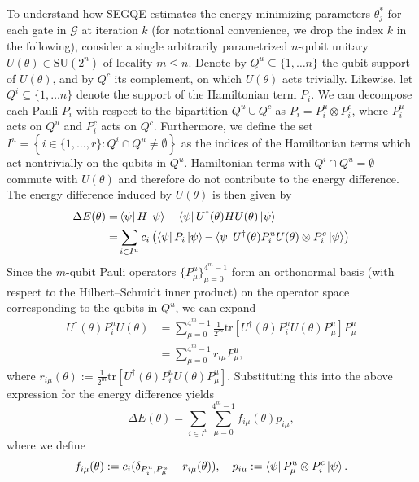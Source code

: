 To understand how SEGQE estimates the energy-minimizing parameters $\theta^*_j$ for each gate in $\mathcal{G}$ at iteration $k$ (for notational convenience, we drop the index $k$ in the following), consider a single arbitrarily parametrized $n$-qubit unitary $U(\theta) \in \mathrm{SU}(2^n)$ of locality $m\leq n$. 
Denote by $Q^u\subseteq\{1,\ldots n\}$ the qubit support of $U(\theta)$, and by $Q^c$ its complement, on which $U(\theta)$ acts trivially. Likewise, let $Q^i\subseteq\{1,\ldots n\}$ denote the support of the Hamiltonian term $P_i$. We can decompose each Pauli $P_i$ with respect to the bipartition $Q^u\cup Q^c$ as $P_i=P^u_i\otimes P^c_i$, where $P^u_i$ acts on $Q^u$ and $P^c_i$ acts on $Q^c$. Furthermore, we define the set $I^u=\left\{i\in\{1,\ldots,r\}: Q^i\cap Q^u\neq \emptyset\right\}$ as the indices of the Hamiltonian terms which act nontrivially on the qubits in $Q^u$. Hamiltonian terms with $Q^i \cap Q^u = \emptyset$ commute with $U(\theta)$ and therefore do not contribute to the energy difference. The energy difference induced by $U(\theta)$ is then given by
\begin{align}
    \Delta E(\theta)=&\bra{\psi}H\ket{\psi}-\bra{\psi}U^\dagger(\theta) H U(\theta) \ket{\psi}\\
	=& \sum_{i\in I^u}c_i 
	\left(\bra{\psi}P_i\ket{\psi}{-}\bra{\psi}U^\dagger(\theta) P^u_i U(\theta)\otimes P_i^c\ket{\psi} \right) \nonumber
\end{align}
    Since the $m$-qubit Pauli operators $\{P_\mu^u\}_{\mu=0}^{4^m-1}$ form an orthonormal basis (with respect to the Hilbert--Schmidt inner product) on the operator space corresponding to the qubits in $Q^u$, we can expand
    \begin{align}
        U^\dagger(\theta) P^u_i U(\theta) &= \sum_{\mu=0}^{4^m-1}\frac{1}{2^m}\mathrm{tr}\left[U^\dagger(\theta) P^u_iU(\theta)P_\mu^u\right]P_\mu^u\\&=\sum_{\mu=0}^{4^m-1}r_{i\mu}P_\mu^u,
    \end{align}
    where $r_{i\mu}(\theta):=\frac{1}{2^m}\mathrm{tr}\left[U^\dagger(\theta) P^u_iU(\theta)P_\mu^u\right]$. Substituting this into the above expression for the energy difference yields
    \begin{equation}
        \label{eq:energy_differences}
        \Delta E(\theta)=\sum_{i\in I^u}\sum^{4^m-1}_{\mu=0}f_{i\mu}(\theta)p_{i\mu},
    \end{equation}
    where we define
    \begin{equation*}
        f_{i\mu}(\theta):= c_i(\delta_{P^u_i,P_\mu^u} - r_{i\mu}(\theta)),\quad p_{i\mu} := \bra{\psi} P_\mu^u \otimes P_i^c \ket{\psi}.
    \end{equation*}
